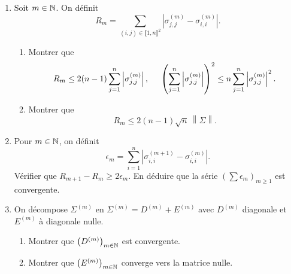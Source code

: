 \begin{enumerate}
 \item Soit $m\in \mathbb{N}$. On définit
\begin{displaymath}
 R_m = \sum_{(i,j)\in \llbracket 1,n \rrbracket^2} \left| \sigma_{j,j}^{(m)} - \sigma_{i,i}^{(m)}\right|.
\end{displaymath}
\begin{enumerate}
 \item Montrer que 
\begin{displaymath}
 R_m \leq 2(n-1)\sum_{j=1}^n \left|\sigma_{j,j}^{(m)}\right|, \hspace{0.5cm}
 \left( \sum_{j=1}^n \left|\sigma_{j,j}^{(m)}\right|\right)^2 \leq n \sum_{j=1}^n \left|\sigma_{j,j}^{(m)}\right|^2.^{} 
\end{displaymath}
 \item Montrer que 
\begin{displaymath}
 R_m \leq 2(n-1)\sqrt{n}\, \left\|\Sigma \right\|.
\end{displaymath}
\end{enumerate}

 \item Pour $m\in \mathbb{N}$, on définit
\begin{displaymath}
 \epsilon_m = \sum_{i=1}^n \left| \sigma_{i,i}^{(m+1)} - \sigma_{i,i}^{(m)}\right|.
\end{displaymath}
Vérifier que $R_{m+1} - R_{m}\geq 2 \epsilon_m$. En déduire que la série $\left( \sum \epsilon_m \right)_{m \geq 1}$ est convergente. 

 \item On décompose $\Sigma^{(m)}$ en $\Sigma^{(m)}= D^{(m)} + E^{(m)}$ avec $D^{(m)}$ diagonale et $E^{(m)}$ à diagonale nulle.
\begin{enumerate}
 \item Montrer que $\left( D^{(m)} \right)_{m \in \mathbb{N}}$ est convergente.
 \item Montrer que $\left( E^{(m)} \right)_{m \in \mathbb{N}}$ converge vers la matrice nulle.
\end{enumerate}

\end{enumerate}

